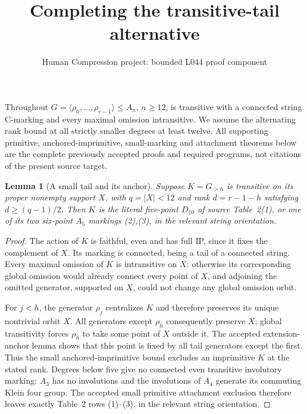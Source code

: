 \documentclass[11pt,a4paper]{article}
\title{Completing the transitive-tail alternative}
\author{Human Compression project: bounded L044 proof component}
\date{}
\newtheorem{lemma}{Lemma}
\newcommand{\gen}[1]{\langle#1\rangle}
\begin{document}
\maketitle
Throughout $G=\gen{\rho_0,\ldots,\rho_{r-1}}\leq A_n$,
$n\geq12$, is transitive with a connected string C-marking
and every maximal omission intransitive. We assume the
alternating rank bound at all strictly smaller degrees at
least twelve. All supporting primitive, anchored-imprimitive,
small-marking and attachment theorems below are the complete
previously accepted proofs and required programs, not citations
of the present source target.

\begin{lemma}[A small tail and its anchor]\label{small}
Suppose $K=G_{>h}$ is transitive on its proper nonempty
support $X$, with $q=|X|<12$ and rank $d=r-1-h$ satisfying
$d\geq(q-1)/2$. Then $K$ is the literal five-point
$D_{10}$ of source Table~2(1), or one of its two six-point
$A_5$ markings (2),(3), in the relevant string orientation.
\end{lemma}
\begin{proof}
The action of $K$ is faithful, even and has full IP, since
it fixes the complement of $X$. Its marking is connected,
being a tail of a connected string. Every maximal omission
of $K$ is intransitive on $X$: otherwise its corresponding
global omission would already connect every point of $X$,
and adjoining the omitted generator, supported on $X$,
could not change any global omission orbit.

For $j<h$, the generator $\rho_j$ centralizes $K$ and
therefore preserves its unique nontrivial orbit $X$.
All generators except $\rho_h$ consequently preserve $X$;
global transitivity forces $\rho_h$ to take some point of
$X$ outside it. The accepted extension-anchor lemma shows
that this point is fixed by all tail generators except the
first. Thus the small anchored-imprimitive bound excludes
an imprimitive $K$ at the stated rank. Degrees below five
give no connected even transitive involutory marking:
$A_3$ has no involutions and the involutions of $A_4$
generate its commuting Klein four group. The accepted small
primitive attachment exclusion therefore leaves exactly
Table~2 rows (1)--(3), in the relevant string orientation.
\end{proof}
\end{document}
